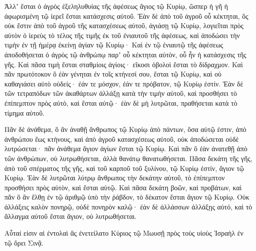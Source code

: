 {Ἀλλʼ ἔσται ὁ ἀγρὸς ἐξεληλυθυίας τῆς ἀφέσεως ἅγιος τῷ Κυρίῳ, ὥσπερ ἡ γῆ ἡ ἀφωρισμένη τῷ ἱερεῖ ἔσται κατάσχεσις αὐτοῦ.
Ἐὰν δὲ ἀπὸ τοῦ ἀγροῦ οὗ κέκτηται, ὃς οὐκ ἔστιν ἀπὸ τοῦ ἀγροῦ τῆς κατασχέσεως αὐτοῦ, ἁγιάσῃ τῷ Κυρίῳ,
λογιεῖται πρὸς αὐτὸν ὁ ἱερεὺς τὸ τέλος τῆς τιμῆς ἐκ τοῦ ἐνιαυτοῦ τῆς ἀφέσεως, καὶ ἀποδώσει τὴν τιμὴν ἐν τῇ ἡμέρᾳ ἐκείνῃ ἁγίαν τῷ Κυρίῳ·
Καὶ ἐν τῷ ἐνιαυτῷ τῆς ἀφέσεως ἀποδοθήσεται ὁ ἀγρὸς τῷ ἀνθρώπῳ παρʼ οὗ κέκτηται αὐτὸν, οὗ ἦν ἡ κατάσχεσις τῆς γῆς.
Καὶ πᾶσα τιμὴ ἔσται σταθμίοις ἁγίοις· εἴκοσι ὀβολοὶ ἔσται τὸ δίδραχμον.
Καὶ πᾶν πρωτότοκον ὃ ἐὰν γένηται ἐν τοῖς κτήνεσί σου, ἔσται τῷ Κυρίῳ, καὶ οὐ καθαγιάσει αὐτὸ οὐδείς· ἐάν τε μόσχον, ἐάν τε πρόβατον, τῷ Κυρίῳ ἐστίν.
Ἐὰν δὲ τῶν τετραπόδων τῶν ἀκαθάρτων ἀλλάξῃ κατὰ τὴν τιμὴν αὐτοῦ, καὶ προσθήσει τὸ ἐπίπεμπτον πρὸς αὐτὸ, καὶ ἔσται αὐτῷ· ἐὰν δὲ μὴ λυτρῶται, πραθήσεται κατὰ τὸ τίμημα αὐτοῦ.
\par }{\PP {}Πᾶν δὲ ἀνάθεμα, ὃ ἂν ἀναθῇ ἄνθρωπος τῷ Κυρίῳ ἀπὸ πάντων, ὅσα αὐτῷ ἐστιν, ἀπὸ ἀνθρώπου ἕως κτήνους, καὶ ἀπὸ ἀγροῦ κατασχέσεως αὐτοῦ, οὐκ ἀποδώσεται οὐδὲ λυτρώσεται· πᾶν ἀνάθεμα ἅγιον ἁγίων ἔσται τῷ Κυρίῳ.
Καὶ πᾶν ὃ ἐὰν ἀνατεθῇ ἀπὸ τῶν ἀνθρώπων, οὐ λυτρωθήσεται, ἀλλὰ θανάτῳ θανατωθήσεται.
Πᾶσα δεκάτη τῆς γῆς, ἀπὸ τοῦ σπέρματος τῆς γῆς, καὶ τοῦ καρποῦ τοῦ ξυλίνου, τῷ Κυρίῳ ἐστίν, ἅγιον τῷ Κυρίῳ.
Ἐὰν δὲ λυτρῶται λύτρῳ ἄνθρωπος τὴν δεκάτην αὐτοῦ, τὸ ἐπίπεμπτον προσθήσει πρὸς αὐτὸν, καὶ ἔσται αὐτῷ.
Καὶ πᾶσα δεκάτη βοῶν, καὶ προβάτων, καὶ πᾶν ὃ ἂν ἔλθῃ ἐν τῷ ἀριθμῷ ὑπὸ τὴν ῥάβδον, τὸ δέκατον ἔσται ἅγιον τῷ Κυρίῳ.
Οὐκ ἀλλάξεις καλὸν πονηρῷ, οὐδὲ πονηρὸν καλῷ· ἐὰν δὲ ἀλλάσσων ἀλλάξῃς αὐτό, καὶ τὸ ἄλλαγμα αὐτοῦ ἔσται ἅγιον, οὐ λυτρωθήσεται.
\par }{\PP {}Αὗταί εἰσιν αἱ ἐντολαὶ ἃς ἐνετείλατο Κύριος τῷ Μωυσῇ πρὸς τοὺς υἱοὺς Ἰσραὴλ ἐν τῷ ὄρει Σινᾷ.
\par }